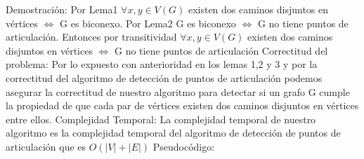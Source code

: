 \documentclass{article}
\begin{document}
    Demostraci\'on:\newline
    Por Lema1  $\forall x,y\in V(G)$ existen dos caminos disjuntos en v\'ertices $\Longleftrightarrow$ G es biconexo. 
    Por Lema2 G es biconexo $\Longleftrightarrow$ G no tiene puntos de articulaci\'on.
    Entonces por transitividad $\forall x,y\in V(G)$ existen dos caminos disjuntos en v\'ertices 
    $\Longleftrightarrow$ G no tiene puntos de articulaci\'on
    \newline
    \newline
    \newline
    Correctitud del problema:
    \newline
    Por lo expuesto con anterioridad en los lemas 1,2 y 3 y por la correctitud del algoritmo de detecci\'on de puntos de 
    articulaci\'on  podemos asegurar la correctitud de nuestro algoritmo para detectar si  un grafo G cumple la propiedad 
    de que cada par de v\'ertices existen dos caminos disjuntos en v\'ertices entre ellos.
    \newline
    \newline
    \newline
    Complejidad Temporal:\newline
    La complejidad temporal de nuestro algoritmo es la complejidad temporal del algoritmo de detecci\'on de puntos 
    de articulaci\'on que es $O(|V|+|E|)$
    \newline
    \newline
    Pseudoc\'odigo:\newline
\end{document}
